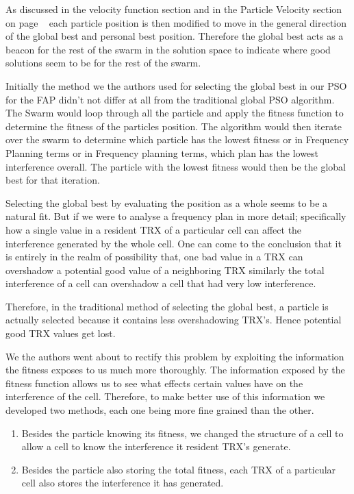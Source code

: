 As discussed in the velocity function section and in the Particle Velocity section on page ~\pageref{sec:particleVelocity} each particle position is then modified to move in the general direction of the global best and personal best position. Therefore the global best acts as a beacon for the rest of the swarm in the solution space to indicate where good solutions seem to be for the rest of the swarm.

Initially the method we the authors used for selecting the global best in our PSO for the FAP didn't not differ at all from the traditional global PSO algorithm. The Swarm would loop through all the particle and apply the fitness function to determine the fitness of the particles position. The algorithm would then iterate over the swarm to determine which particle has the lowest fitness or in Frequency Planning terms or in Frequency planning terms, which plan has the lowest interference overall. The particle with the lowest fitness would then be the global best for that iteration.

Selecting the global best by evaluating the position as a whole seems to be a natural fit. But if we were to analyse a frequency plan in more detail; specifically how a single value in a resident TRX of a particular cell can affect the interference generated by the whole cell. One can come to the conclusion that it is entirely in the realm of possibility that, one bad value in a TRX can overshadow a potential good value of a neighboring TRX similarly the total interference of a cell can overshadow a cell that had very low interference. 

Therefore, in the traditional method of selecting the global best, a particle is actually selected because it contains less overshadowing TRX's. Hence potential good TRX values get lost.

We the authors went about to rectify this problem by exploiting the information the fitness exposes to us much more thoroughly. The information exposed by the fitness function allows us to see what effects certain values have on the interference of the cell. Therefore, to make better use of this information we developed two methods, each one being more fine grained than the other.

\begin{enumerate}
\item Besides the particle knowing its fitness, we changed the structure of a cell to allow a cell to know the interference it resident TRX's generate.
\item Besides the particle also storing the total fitness, each TRX of a particular cell also stores the interference it has generated.
\end{enumerate}

